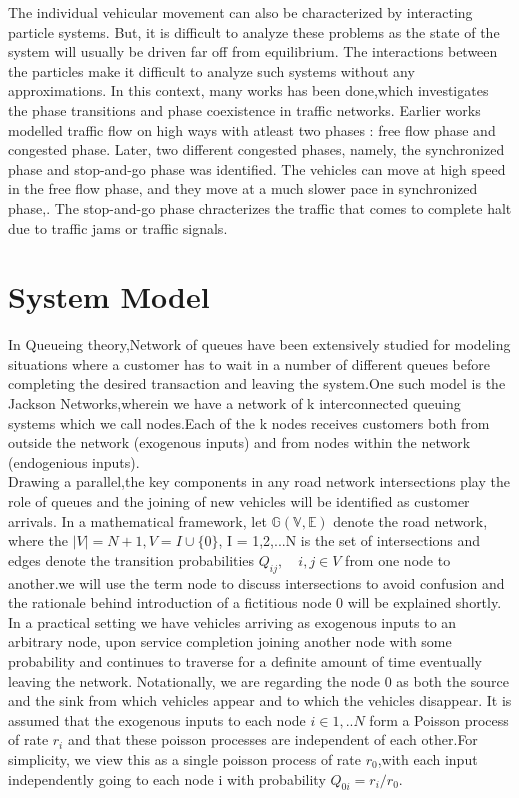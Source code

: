 \documentclass[a4paper,12pt]{scrartcl}
\begin{document}
The individual vehicular movement can also be characterized by interacting particle systems. But, it is difficult to analyze these problems as the state of the system will usually be driven far off from equilibrium. The interactions between the particles make it difficult to analyze such systems without any approximations. In this context, many works has been done,which investigates the phase transitions and phase coexistence in traffic networks\cite{dal2017MMAS}. Earlier works modelled traffic flow on high ways with atleast two phases : free flow phase and congested phase. Later, two different congested phases, namely, the synchronized phase and stop-and-go phase was identified. The vehicles can move at high speed in the free flow phase, and they move at a much slower pace in synchronized phase,. The stop-and-go phase chracterizes the traffic that comes to complete halt due to traffic jams or traffic signals.
\newpage
\section*{System Model}
In Queueing theory,Network of queues have been extensively studied for modeling situations where a customer has to wait in a number of different queues before completing the desired transaction and leaving the system.One such model is the Jackson Networks,wherein we have a network of k interconnected queuing systems which we call nodes.Each of the k nodes receives customers both from outside the network (exogenous inputs) and from nodes within the network (endogenious inputs).\\ 
Drawing a parallel,the key components in any road network intersections play the role of queues and the joining of new vehicles will be identified as customer arrivals.
In a mathematical framework, let $\mathbb{G(V,E)}$ denote the road network, where the $|V|=N+1 , V = I \cup \{0\}$, I = {1,2,...N} is the set of intersections and edges denote the transition probabilities $Q_{ij},\quad i,j\in V$ from one node to another.we will use the term node to discuss intersections to avoid confusion and the rationale behind introduction of a fictitious node $0$ will be explained shortly.\\ 
In a practical setting we have vehicles arriving as exogenous inputs to an arbitrary node, upon service completion joining another node with some probability and continues to traverse for a definite amount of time eventually leaving the network. Notationally, we are regarding the node $0$ as both the source and the sink from which vehicles appear and to which the vehicles disappear.
It is assumed that the exogenous inputs to each node $i\in {1,..N}$ form a Poisson process of rate $r_i$ and that these poisson processes are independent of each other.For simplicity, we view this as a single poisson process of rate $r_0$,with each input independently going to each node i with probability $Q_{0i} = r_i/r_0$.\\
\end{document}
